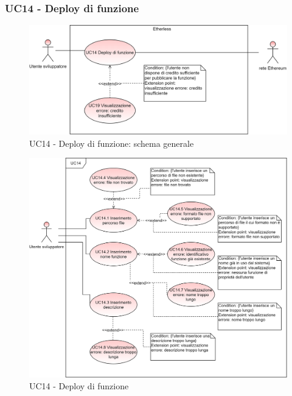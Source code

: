 \subsubsection{UC14 - Deploy di funzione}
\begin{figure}[h]
	\centering
	\includegraphics[scale=\ucs]{./res/img/UC14G.png}
	\caption {UC14 - Deploy di funzione: schema generale}
\end{figure}
\begin{figure}[h]
	\centering
	\includegraphics[scale=\ucs]{./res/img/UC14.png}
	\caption {UC14 - Deploy di funzione}
\end{figure}
